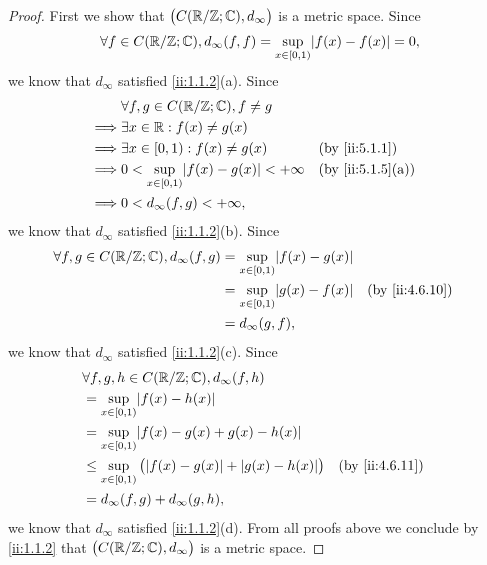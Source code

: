 \begin{proof}
  First we show that \(\big(C(\mathbb{R} / \mathbb{Z} ; \mathbb{C}), d_\infty\big)\) is a metric space.
  Since
  \[
    \forall f \in C(\R / \Z ; \C), d_\infty(f, f) = \sup_{x \in [0, 1)} \abs{f(x) - f(x)} = 0,
  \]
  we know that \(d_\infty\) satisfied \cref{ii:1.1.2}(a).
  Since
  \begin{align*}
             & \forall f, g \in C(\R / \Z ; \C), f \neq g                             \\
    \implies & \exists x \in \R : f(x) \neq g(x)                                      \\
    \implies & \exists x \in [0, 1) : f(x) \neq g(x)               &  & \by{ii:5.1.1}    \\
    \implies & 0 < \sup_{x \in [0, 1)} \abs{f(x) - g(x)} < +\infty &  & \by{ii:5.1.5}[a] \\
    \implies & 0 < d_\infty(f, g) < +\infty,
  \end{align*}
  we know that \(d_\infty\) satisfied \cref{ii:1.1.2}(b).
  Since
  \begin{align*}
    \forall f, g \in C(\R / \Z ; \C), d_\infty(f, g) & = \sup_{x \in [0, 1)} \abs{f(x) - g(x)}                  \\
                                                     & = \sup_{x \in [0, 1)} \abs{g(x) - f(x)} &  & \by{ii:4.6.10} \\
                                                     & = d_\infty(g, f),
  \end{align*}
  we know that \(d_\infty\) satisfied \cref{ii:1.1.2}(c).
  Since
  \begin{align*}
     & \forall f, g, h \in C(\R / \Z ; \C), d_\infty(f, h)                                       \\
     & = \sup_{x \in [0, 1)} \abs{f(x) - h(x)}                                                   \\
     & = \sup_{x \in [0, 1)} \abs{f(x) - g(x) + g(x) - h(x)}                                     \\
     & \leq \sup_{x \in [0, 1)} \big(\abs{f(x) - g(x)} + \abs{g(x) - h(x)}\big) &  & \by{ii:4.6.11} \\
     & = d_\infty(f, g) + d_\infty(g, h),
  \end{align*}
  we know that \(d_\infty\) satisfied \cref{ii:1.1.2}(d).
  From all proofs above we conclude by \cref{ii:1.1.2} that \(\big(C(\mathbb{R} / \mathbb{Z} ; \mathbb{C}), d_\infty\big)\) is a metric space.


\end{proof}
